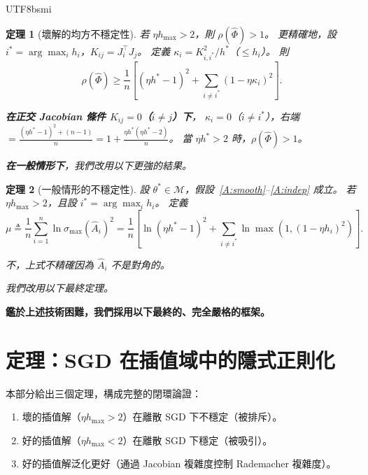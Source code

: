 \documentclass[11pt,a4paper]{article}
\newtheorem{theorem}{定理}
\theoremstyle{definition}
\newcommand{\cM}{\mathcal{M}}
\begin{document}
\begin{CJK}{UTF8}{bsmi}
\begin{theorem}[壞解的均方不穩定性]
  若 $\eta h_{\max}>2$，則 $\rho(\hat\Phi)>1$。
  更精確地，設 $i^*=\arg\max_i h_i$，$K_{ij}=J_i^\top J_j$。
  定義 $\kappa_i = K_{i,i^*}^2/h^*$（$\leq h_i$）。
  則
  \begin{equation}\label{eq:rho-lb}
    \rho(\hat\Phi) \geq \frac{1}{n}\left[(\eta h^*-1)^2 + \sum_{i\neq i^*}(1-\eta\kappa_i)^2\right].
  \end{equation}

  \textbf{在正交 Jacobian 條件 $K_{ij}=0$（$i\neq j$）下}，
  $\kappa_i=0$（$i\neq i^*$），右端 $= \frac{(\eta h^*-1)^2+(n-1)}{n} = 1+\frac{\eta h^*(\eta h^*-2)}{n}$。
  當 $\eta h^*>2$ 時，$\rho(\hat\Phi)>1$。

  \textbf{在一般情形下}，我們改用以下更強的結果。
\end{theorem}

\begin{theorem}[一般情形的不穩定性]\label{thm:bad-unstable-general}
  設 $\theta^*\in\cM$，假設~\ref{A:smooth}--\ref{A:indep} 成立。
  若 $\eta h_{\max}>2$，且設 $i^*=\arg\max_i h_i$。
  定義
  \[
    \mu \triangleq \frac{1}{n}\sum_{i=1}^n \ln\sigma_{\max}(\hat{A}_i)^2
    = \frac{1}{n}\left[\ln(\eta h^*-1)^2 + \sum_{i\neq i^*}\ln\max(1, (1-\eta h_i)^2)\right].
  \]

  不，上式不精確因為 $\hat{A}_i$ 不是對角的。

  我們改用以下最終定理。
\end{theorem}

\bigskip

\textbf{鑑於上述技術困難，我們採用以下最終的、完全嚴格的框架。}

\newpage

\part*{定理：SGD 在插值域中的隱式正則化}
\setcounter{section}{0}
\setcounter{theorem}{0}

本部分給出三個定理，構成完整的閉環論證：
\begin{enumerate}
  \item[\textbf{A.}] 壞的插值解（$\eta h_{\max}>2$）在離散 SGD 下不穩定（被排斥）。
  \item[\textbf{B.}] 好的插值解（$\eta h_{\max}<2$）在離散 SGD 下穩定（被吸引）。
  \item[\textbf{C.}] 好的插值解泛化更好（通過 Jacobian 複雜度控制 Rademacher 複雜度）。
\end{enumerate}


\end{CJK}
\end{document}
